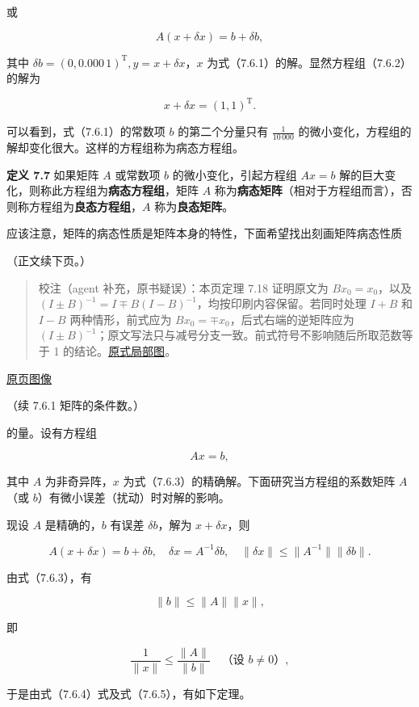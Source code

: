\documentclass[
  10pt,
  fontset=fandol]{ctexart}
\begin{document}
或

\[
A(x+\delta x)=b+\delta b,
\tag{7.6.2}
\]

其中 \(\delta b=(0,0.000\,1)^{\mathrm T},y=x+\delta x\)，\(x\) 为式（7.6.1）的解。显然方程组（7.6.2）的解为

\[
x+\delta x=(1,1)^{\mathrm T}.
\]

可以看到，式（7.6.1）的常数项 \(b\) 的第二个分量只有 \(\frac1{10\,000}\) 的微小变化，方程组的解却变化很大。这样的方程组称为病态方程组。

\textbf{定义 7.7} 如果矩阵 \(A\) 或常数项 \(b\) 的微小变化，引起方程组 \(Ax=b\) 解的巨大变化，则称此方程组为\textbf{病态方程组}，矩阵 \(A\) 称为\textbf{病态矩阵}（相对于方程组而言），否则称方程组为\textbf{良态方程组}，\(A\) 称为\textbf{良态矩阵}。

应该注意，矩阵的病态性质是矩阵本身的特性，下面希望找出刻画矩阵病态性质

（正文续下页。）

\begin{quote}
校注（agent 补充，原书疑误）：本页定理 7.18 证明原文为 \(Bx_0=x_0\)，以及 \((I\pm B)^{-1}=I\mp B(I-B)^{-1}\)，均按印刷内容保留。若同时处理 \(I+B\) 和 \(I-B\) 两种情形，前式应为 \(Bx_0=\mp x_0\)，后式右端的逆矩阵应为 \((I\pm B)^{-1}\)；原文写法只与减号分支一致。前式符号不影响随后所取范数等于 1 的结论。\href{../assets/ch07b/205-inverse-signs.png}{原式局部图}。
\end{quote}

\href{../../source-images/pdf-206.jpeg}{原页图像}

（续 7.6.1 矩阵的条件数。）

的量。设有方程组

\[
Ax=b,
\tag{7.6.3}
\]

其中 \(A\) 为非奇异阵，\(x\) 为式（7.6.3）的精确解。下面研究当方程组的系数矩阵 \(A\)（或 \(b\)）有微小误差（扰动）时对解的影响。

现设 \(A\) 是精确的，\(b\) 有误差 \(\delta b\)，解为 \(x+\delta x\)，则

\[
A(x+\delta x)=b+\delta b,\quad\delta x=A^{-1}\delta b,\quad\|\delta x\|\leqslant\|A^{-1}\|\|\delta b\|.
\tag{7.6.4}
\]

由式（7.6.3），有

\[
\|b\|\leqslant\|A\|\|x\|,
\]

即

\[
\frac1{\|x\|}\leqslant\frac{\|A\|}{\|b\|}\quad\text{（设 }b\neq0\text{）},
\tag{7.6.5}
\]

于是由式（7.6.4）式及式（7.6.5），有如下定理。
\end{document}

